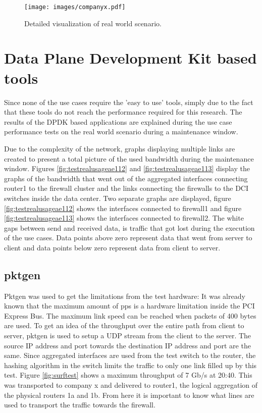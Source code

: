 \begin{figure}[H] 
  \texttt{[image: images/companyx.pdf]}
  \caption{Detailed visualization of real world scenario.}
  \label{fig:companyx}
\end{figure}

\section{Data Plane Development Kit based tools}
Since none of the use cases require the 'easy to use' tools, simply due to the fact that these tools do not reach the performance required for this research. 
The results of the DPDK based applications are explained during the use case performance tests on the real world scenario during a maintenance window.

Due to the complexity of the network, graphs displaying multiple links are created to present a total picture of the used bandwidth during the maintenance window.
Figures \ref{fig:testrealusageae112} and \ref{fig:testrealusageae113} display the graphs of the bandwidth that went out of the aggregated interfaces connecting router1 to the firewall cluster and the links connecting the firewalls to the DCI switches inside the data center. 
Two separate graphs are displayed, figure \ref{fig:testrealusageae112} shows the interfaces connected to firewall1 and figure \ref{fig:testrealusageae113} shows the interfaces connected to firewall2. 
The white gaps between send and received data, is traffic that got lost during the execution of the use cases. 
Data points above zero represent data that went from server to client and data points below zero represent data from client to server.  
  
\subsection{pktgen}
Pktgen was used to get the limitations from the test hardware: It was already known that the maximum amount of pps is a hardware limitation inside the PCI Express Bus. 
The maximum link speed can be reached when packets of 400 bytes are used. To get an idea of the throughput over the entire path from client to server, pktgen is used to setup a UDP stream from the client to the server. 
The source IP address and port towards the destination IP address and port are the same. Since aggregated interfaces are used from the test switch to the router, the hashing algorithm in the switch limits the traffic to only one link filled up by this test. 
Figure \ref{fig:surftest} shows a maximum throughput of 7 Gb/s at 20:40. This was transported to company x and delivered to router1, the logical aggregation of the physical routers 1a and 1b. From here it is important to know what lines are used to transport the traffic towards the firewall.

